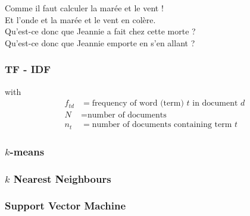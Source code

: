 \begin{frame}[t]
{   Comme il faut calculer la marée et le vent !\\
   Et l'onde et la marée et le vent en colère.\\[5mm]

   Qu'est-ce donc que Jeannie a fait chez cette morte ?\\
   Qu'est-ce donc que Jeannie emporte en s'en allant ?\\[5mm]

  }
\end{frame}

\begin{frame}
  \frametitle{TF - IDF}

  with
  \begin{align*}
    f_{td} &= \mbox{frequency of word (term) $t$ in document $d$} \\
    N &= \mbox{number of documents}\\
    n_t &= \mbox{number of documents containing term $t$}
  \end{align*}
\end{frame}

\begin{frame}
  \frametitle{$k$-means}
\end{frame}

\begin{frame}
  \frametitle{$k$ Nearest Neighbours}
\end{frame}

\begin{frame}
  \frametitle{Support Vector Machine}

\end{frame}

